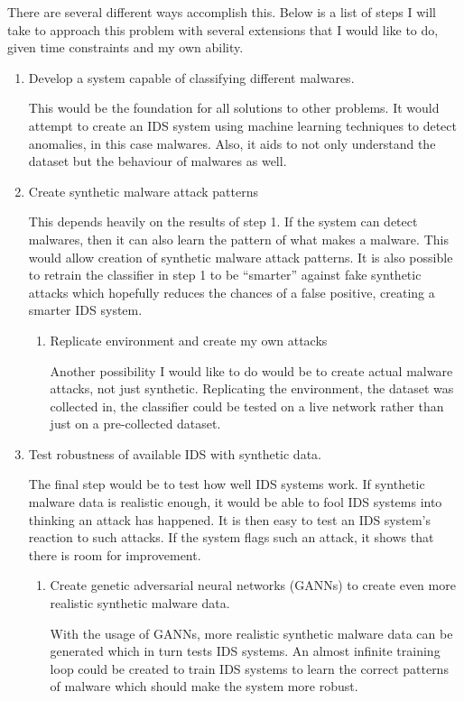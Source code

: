 \documentclass[11pt]{article}
\begin{document}
There are several different ways accomplish this. Below is a list of steps I will take to approach this problem with several extensions that I would like to do, given time constraints and my own ability. 

\begin{enumerate}
  \item Develop a system capable of classifying different malwares. 
  
 This would be the foundation for all solutions to other problems. It would attempt to create an IDS system using machine learning techniques to detect anomalies, in this case malwares. Also, it aids to not only understand the dataset but the behaviour of malwares as well. 

  \item Create synthetic malware attack patterns

  This depends heavily on the results of step 1. If the system can detect malwares, then it can also learn the pattern of what makes a malware. This would allow creation of synthetic malware attack patterns. It is also possible to retrain the classifier in step 1 to be “smarter” against fake synthetic attacks which hopefully reduces the chances of a false positive, creating a smarter IDS system. 

  \begin{enumerate}
    \item{Replicate environment and create my own attacks}

   Another possibility I would like to do would be to create actual malware attacks, not just synthetic. Replicating the environment, the dataset was collected in, the classifier could be tested on a live network rather than just on a pre-collected dataset. 
  \end{enumerate}  

  \item Test robustness of available IDS with synthetic data.

 The final step would be to test how well IDS systems work. If synthetic malware data is realistic enough, it would be able to fool IDS systems into thinking an attack has happened. It is then easy to test an IDS system’s reaction to such attacks. If the system flags such an attack, it shows that there is room for improvement. 

  \begin{enumerate}
    \item{Create genetic adversarial neural networks (GANNs) to create even more realistic synthetic malware data.}

   With the usage of GANNs, more realistic synthetic malware data can be generated which in turn tests IDS systems. An almost infinite training loop could be created to train IDS systems to learn the correct patterns of malware which should make the system more robust. 
  \end{enumerate}  
\end{enumerate}
\end{document}
